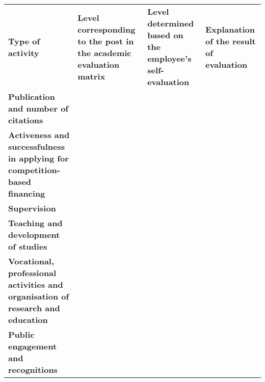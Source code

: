 \begin{landscape}

\def\arraystretch{2.5}
\begin{tabular}{| m{12em} | m{20em} | m{20em} | m{20em} |}
  \hline
  \rowcolor{Gray}
  \multicolumn{4}{|l|}{\textbf{Post:}}
  \\
  \hline
  \rowcolor{Gray}
\textbf{Type of activity}
&
\textbf{Level corresponding to the post in the academic evaluation matrix}
&
\textbf{Level determined based on the employee’s self-evaluation}
&
\textbf{Explanation of the result of evaluation}
\\
\hline 
\textbf{Publication and number of citations}
&
&
&
\\
\hline

\textbf{Activeness and successfulness in applying for
  competition-based financing} &
&
&
\\
\hline

\textbf{Supervision} &
&
&
\\
\hline

\textbf{Teaching and development of studies}
&
&
&
\\ \hline

\textbf{Vocational, professional activities and organisation of
  research and education}
&
&
&

\\ \hline

\textbf{Public engagement and recognitions}
&
&
&

\\
\hline
\end{tabular}
\end{landscape}


